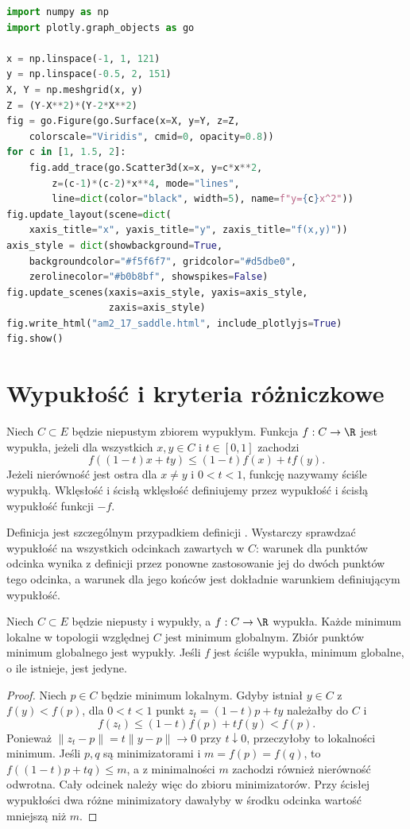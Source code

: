 \begin{lstlisting}[language=Python]
import numpy as np
import plotly.graph_objects as go

x = np.linspace(-1, 1, 121)
y = np.linspace(-0.5, 2, 151)
X, Y = np.meshgrid(x, y)
Z = (Y-X**2)*(Y-2*X**2)
fig = go.Figure(go.Surface(x=X, y=Y, z=Z,
    colorscale="Viridis", cmid=0, opacity=0.8))
for c in [1, 1.5, 2]:
    fig.add_trace(go.Scatter3d(x=x, y=c*x**2,
        z=(c-1)*(c-2)*x**4, mode="lines",
        line=dict(color="black", width=5), name=f"y={c}x^2"))
fig.update_layout(scene=dict(
    xaxis_title="x", yaxis_title="y", zaxis_title="f(x,y)"))
axis_style = dict(showbackground=True,
    backgroundcolor="#f5f6f7", gridcolor="#d5dbe0",
    zerolinecolor="#b0b8bf", showspikes=False)
fig.update_scenes(xaxis=axis_style, yaxis=axis_style,
                  zaxis=axis_style)
fig.write_html("am2_17_saddle.html", include_plotlyjs=True)
fig.show()
\end{lstlisting}


\section{Wypukłość i kryteria różniczkowe}

\begin{definicja}
\label{ma2:def:convex-function}
Niech $C\subset E$ będzie niepustym zbiorem wypukłym.
Funkcja $f:C\to\R$ jest wypukła, jeżeli dla wszystkich
$x,y\in C$ i $t\in[0,1]$ zachodzi
\[
 f((1-t)x+ty)\le (1-t)f(x)+tf(y).
\]
Jeżeli nierówność jest ostra dla $x\ne y$ i $0<t<1$,
funkcję nazywamy ściśle wypukłą.
Wklęsłość i ścisłą wklęsłość definiujemy przez
wypukłość i ścisłą wypukłość funkcji $-f$.
\end{definicja}
Definicja jest szczególnym przypadkiem definicji
.
Wystarczy sprawdzać wypukłość na wszystkich odcinkach
zawartych w $C$: warunek dla punktów odcinka wynika
z definicji przez ponowne zastosowanie jej do dwóch
punktów tego odcinka, a warunek dla jego końców
jest dokładnie warunkiem definiującym wypukłość.

\begin{twierdzenie}
\label{ma2:thm:convex-local-global}
Niech $C\subset E$ będzie niepusty i wypukły,
a $f:C\to\R$ wypukła. Każde minimum lokalne
w topologii względnej $C$ jest minimum globalnym.
Zbiór punktów minimum globalnego jest wypukły.
Jeśli $f$ jest ściśle wypukła, minimum globalne,
o ile istnieje, jest jedyne.
\end{twierdzenie}
\begin{proof}
Niech $p\in C$ będzie minimum lokalnym. Gdyby
istniał $y\in C$ z $f(y)<f(p)$, dla $0<t<1$
punkt $z_t=(1-t)p+ty$ należałby do $C$ i
\[
 f(z_t)\le(1-t)f(p)+tf(y)<f(p).
\]
Ponieważ $\|z_t-p\|=t\|y-p\|\to0$ przy $t\downarrow0$,
przeczyłoby to lokalności minimum.
Jeśli $p,q$ są minimizatorami i $m=f(p)=f(q)$,
to $f((1-t)p+tq)\le m$, a z minimalności $m$
zachodzi również nierówność odwrotna.
Cały odcinek należy więc do zbioru minimizatorów.
Przy ścisłej wypukłości dwa różne minimizatory
dawałyby w środku odcinka wartość mniejszą niż $m$.
\end{proof}

